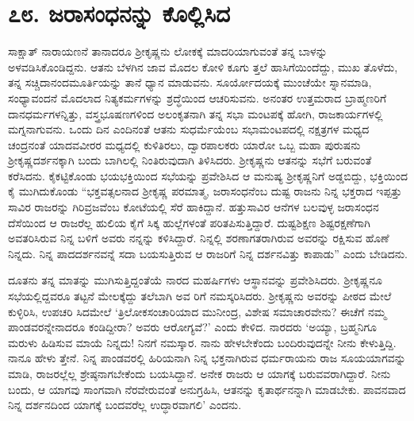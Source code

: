 
\chapter{೭೮. ಜರಾಸಂಧನನ್ನು ಕೊಲ್ಲಿಸಿದ}

ಸಾಕ್ಷಾತ್ ನಾರಾಯಣನೆ ತಾನಾದರೂ ಶ್ರೀಕೃಷ್ಣನು ಲೋಕಕ್ಕೆ ಮಾದರಿಯಾಗುವಂತೆ ತನ್ನ ಬಾಳನ್ನು ಅಳವಡಿಸಿಕೊಂಡಿದ್ದನು. ಆತನು ಬೆಳಗಿನ ಜಾವ ಮೊದಲ ಕೋಳಿ ಕೂಗು ತ್ತಲೆ ಹಾಸಿಗೆಯಿಂದೆದ್ದು, ಮುಖ ತೊಳೆದು, ತನ್ನ ಸಚ್ಚಿದಾನಂದಮೂರ್ತಿಯನ್ನು ತಾನೆ ಧ್ಯಾನ ಮಾಡುವನು. ಸೂರ್ಯೋದಯಕ್ಕೆ ಮುಂಚೆಯೇ ಸ್ನಾನಮಾಡಿ, ಸಂಧ್ಯಾವಂದನೆ ಮೊದಲಾದ ನಿತ್ಯಕರ್ಮಗಳನ್ನು ಶ್ರದ್ಧೆಯಿಂದ ಆಚರಿಸುವನು. ಅನಂತರ ಉತ್ತಮರಾದ ಬ್ರಾಹ್ಮಣರಿಗೆ ದಾನಧರ್ಮಗಳನ್ನಿತ್ತು, ವಸ್ತ್ರಭೂಷಣಗಳಿಂದ ಅಲಂಕೃತನಾಗಿ ತನ್ನ ಸಭಾ ಮಂಟಪಕ್ಕೆ ಹೋಗಿ, ರಾಜಕಾರ್ಯಗಳಲ್ಲಿ ಮಗ್ನನಾಗುವನು. ಒಂದು ದಿನ ಎಂದಿನಂತೆ ಆತನು ಸುಧರ್ಮೆಯೆಂಬ ಸಭಾಮಂಟಪದಲ್ಲಿ ನಕ್ಷತ್ರಗಳ ಮಧ್ಯದ ಚಂದ್ರನಂತೆ ಯಾದವವೀರರ ಮಧ್ಯದಲ್ಲಿ ಕುಳಿತಿರಲು, ದ್ವಾರಪಾಲಕರು ಯಾರೋ ಒಬ್ಬ ಮಹಾ ಪುರುಷನು ಶ್ರೀಕೃಷ್ಣದರ್ಶನಕ್ಕಾಗಿ ಬಂದು ಬಾಗಿಲಲ್ಲಿ ನಿಂತಿರುವುದಾಗಿ ತಿಳಿಸಿದರು. ಶ್ರೀಕೃಷ್ಣನು ಆತನನ್ನು ಸಭೆಗೆ ಬರುವಂತೆ ಕರೆಸಿದನು. ಕೈಕಟ್ಟಿಕೊಂಡು ಭಯಭಕ್ತಿಯಿಂದ ಸಭೆಯನ್ನು ಪ್ರವೇಶಿಸಿದ ಆ ಮನುಷ್ಯ ಶ್ರೀಕೃಷ್ಣನಿಗೆ ಅಡ್ಡಬಿದ್ದು, ಭಕ್ತಿಯಿಂದ ಕೈ ಮುಗಿದುಕೊಂಡು “ಭಕ್ತವತ್ಸಲನಾದ ಶ್ರೀಕೃಷ್ಣ ಪರಮಾತ್ಮ, ಜರಾಸಂಧನೆಂಬ ದುಷ್ಟ ರಾಜನು ನಿನ್ನ ಭಕ್ತರಾದ ಇಪ್ಪತ್ತು ಸಾವಿರ ರಾಜರನ್ನು ಗಿರಿವ್ರಜವೆಂಬ ಕೋಟೆಯಲ್ಲಿ ಸೆರೆ ಹಾಕಿದ್ದಾನೆ. ಹತ್ತುಸಾವಿರ ಆನೆಗಳ ಬಲವುಳ್ಳ ಜರಾಸಂಧನ ದೆಸೆಯಿಂದ ಆ ರಾಜರೆಲ್ಲ ಹುಲಿಯ ಕೈಗೆ ಸಿಕ್ಕ ಹುಲ್ಲೆಗಳಂತೆ ಪರಿತಪಿಸುತ್ತಿದ್ದಾರೆ. ದುಷ್ಟಶಿಕ್ಷಣ ಶಿಷ್ಟರಕ್ಷಣೆಗಾಗಿ ಅವತರಿಸಿರುವ ನಿನ್ನ ಬಳಿಗೆ ಅವರು ನನ್ನನ್ನು ಕಳಿಸಿದ್ದಾರೆ. ನಿನ್ನಲ್ಲಿ ಶರಣಾಗತರಾಗಿರುವ ಅವರನ್ನು ರಕ್ಷಿಸುವ ಹೊಣೆ ನಿನ್ನದು. ನಿನ್ನ ಪಾದದರ್ಶನವನ್ನೆ ಸದಾ ಬಯಸುತ್ತಿರುವ ಆ ರಾಜರಿಗೆ ನಿನ್ನ ದರ್ಶನವಿತ್ತು ಕಾಪಾಡು” ಎಂದು ಬೇಡಿದನು.

ದೂತನು ತನ್ನ ಮಾತನ್ನು ಮುಗಿಸುತ್ತಿದ್ದಂತೆಯೆ ನಾರದ ಮಹರ್ಷಿಗಳು ಆಸ್ಥಾನವನ್ನು ಪ್ರವೇಶಿಸಿದರು. ಶ್ರೀಕೃಷ್ಣನೂ ಸಭೆಯಲ್ಲಿದ್ದವರೂ ತಟ್ಟನೆ ಮೇಲಕ್ಕೆದ್ದು ತಲೆಬಾಗಿ ಅವ ರಿಗೆ ನಮಸ್ಕರಿಸಿದರು. ಶ್ರೀಕೃಷ್ಣನು ಅವರನ್ನು ಪೀಠದ ಮೇಲೆ ಕುಳ್ಳಿರಿಸಿ, ಉಪಚರಿ ಸಿದಮೇಲೆ ‘ತ್ರಿಲೋಕಸಂಚಾರಿಯಾದ ಮುನೀಂದ್ರ, ವಿಶೇಷ ಸಮಾಚಾರವೇನು? ಈಚೆಗೆ ನಮ್ಮ ಪಾಂಡವರನ್ನೇನಾದರೂ ಕಂಡಿದ್ದೀರಾ? ಅವರು ಆರೋಗ್ಯವೆ?’ ಎಂದು ಕೇಳಿದ. ನಾರದರು ‘ಅಯ್ಯಾ, ಬ್ರಹ್ಮನಿಗೂ ಮರುಳು ಹಿಡಿಸುವ ಮಾಯೆ ನಿನ್ನದು! ನಿನಗೆ ನಮಸ್ಕಾರ. ನಾನು ಹೇಳಬೇಕೆಂದು ಬಂದಿರುವುದನ್ನೇ ನೀನು ಕೇಳುತ್ತಿದ್ದಿ. ನಾನೂ ಹೇಳು ತ್ತೇನೆ. ನಿನ್ನ ಪಾಂಡವರಲ್ಲಿ ಹಿರಿಯನಾಗಿ ನಿನ್ನ ಭಕ್ತನಾಗಿರುವ ಧರ್ಮರಾಯನು ರಾಜ ಸೂಯಯಾಗವನ್ನು ಮಾಡಿ, ರಾಜರಲ್ಲೆಲ್ಲ ಶ್ರೇಷ್ಠನಾಗಬೇಕೆಂದು ಬಯಸಿದ್ದಾನೆ. ಅನೇಕ ರಾಜರು ಆ ಯಾಗಕ್ಕೆ ಬರುವವರಾಗಿದ್ದಾರೆ. ನೀನು ಬಂದು, ಆ ಯಾಗವು ಸಾಂಗವಾಗಿ ನೆರವೇರುವಂತೆ ಅನುಗ್ರಹಿಸಿ, ಆತನನ್ನು ಕೃತಾರ್ಥನನ್ನಾಗಿ ಮಾಡಬೇಕು. ಪಾವನವಾದ ನಿನ್ನ ದರ್ಶನದಿಂದ ಯಾಗಕ್ಕೆ ಬಂದವರೆಲ್ಲ ಉದ್ಧಾರವಾಗಲಿ’ ಎಂದನು.

